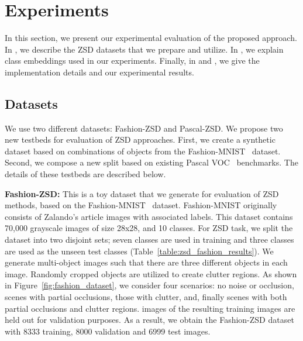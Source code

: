 \section{Experiments}

In this section, we present our experimental evaluation of the proposed approach.  In , we describe the
ZSD datasets that we prepare and utilize.  In , we explain class embeddings used in our experiments.
Finally, in  and , we give the implementation details and our experimental results.

\subsection{Datasets}
\label{sec:dataset}

We use two different datasets: Fashion-ZSD and Pascal-ZSD. 
We propose two new testbeds for evaluation of ZSD approaches. First, we create a synthetic dataset based on combinations
of objects from the Fashion-MNIST~\cite{xiao2017fashion} dataset. Second, 
we compose a new split based on existing Pascal VOC~\cite{pascal_voc_IJCV} benchmarks.
The details of these testbeds are described below.

\vspace{2mm}

\noindent \textbf{Fashion-ZSD:} This is a toy dataset that we generate for evaluation of ZSD methods, based on the Fashion-MNIST~\cite{xiao2017fashion} dataset. Fashion-MNIST originally consists of Zalando's article images with associated labels. This dataset contains 70,000 grayscale images of size 28x28, and 10 classes. For ZSD task, we split the dataset into two disjoint sets; seven classes are used in training and three classes are used as the unseen test classes (Table~\ref{table:zsd_fashion_results}). We generate multi-object images such that there are three different objects in each image. Randomly cropped objects are utilized to create clutter regions. As shown in Figure~\ref{fig:fashion_dataset}, we consider four scenarios: no noise or occlusion, scenes with partial occlusions, those with clutter, and, finally scenes with both partial occlusions and clutter regions.  images of the resulting  training images are held out for validation purposes. As a result, we obtain the Fashion-ZSD dataset with 8333 training, 8000 validation and 6999 test images. 


